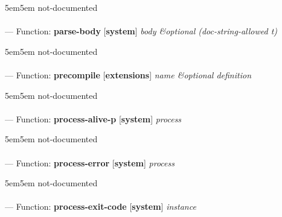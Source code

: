 \begin{adjustwidth}{5em}{5em}
not-documented
\end{adjustwidth}

\paragraph{}
\label{SYSTEM:PARSE-BODY}
--- Function: \textbf{parse-body} [\textbf{system}] \textit{body \&optional (doc-string-allowed t)}

\begin{adjustwidth}{5em}{5em}
not-documented
\end{adjustwidth}

\paragraph{}
\label{EXTENSIONS:PRECOMPILE}
--- Function: \textbf{precompile} [\textbf{extensions}] \textit{name \&optional definition}

\begin{adjustwidth}{5em}{5em}
not-documented
\end{adjustwidth}

\paragraph{}
\label{SYSTEM:PROCESS-ALIVE-P}
--- Function: \textbf{process-alive-p} [\textbf{system}] \textit{process}

\begin{adjustwidth}{5em}{5em}
not-documented
\end{adjustwidth}

\paragraph{}
\label{SYSTEM:PROCESS-ERROR}
--- Function: \textbf{process-error} [\textbf{system}] \textit{process}

\begin{adjustwidth}{5em}{5em}
not-documented
\end{adjustwidth}

\paragraph{}
\label{SYSTEM:PROCESS-EXIT-CODE}
--- Function: \textbf{process-exit-code} [\textbf{system}] \textit{instance}

